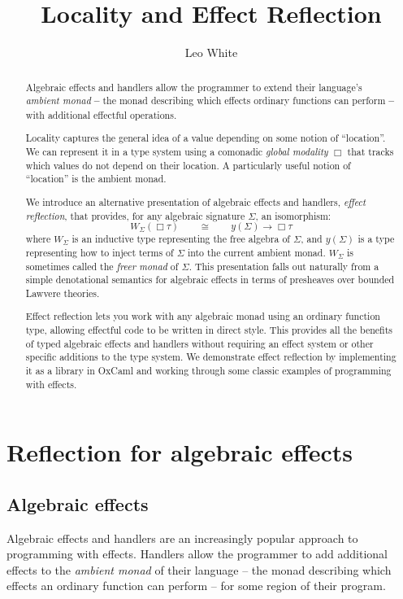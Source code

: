 \documentclass[acmsmall, screen, nonacm]{acmart}
\title{Locality and Effect Reflection}
\author{Leo White}
\affiliation{\institution{Jane Street}\country{UK}}
\date{}
\theoremstyle{definition}
\newcommand{\glob}{\mathop{\Box}}
\newcommand{\yoneda}[1]{y(#1)}
\newcommand{\ind}[1]{W_{#1}}
\begin{document}
\begin{abstract}
  Algebraic effects and handlers allow the programmer to extend their
  language's \emph{ambient monad} \textbf{--} the monad describing which
  effects ordinary functions can perform \textbf{--} with additional
  effectful operations.

  Locality captures the general idea of a value depending on some notion
  of ``location''. We can represent it in a type system using a
  comonadic \emph{global modality} $\glob$ that tracks which values do
  not depend on their location. A particularly useful notion of
  ``location'' is the ambient monad.

  We introduce an alternative presentation of algebraic effects and
  handlers, \emph{effect reflection}, that provides, for any algebraic
  signature $\Sigma$, an isomorphism:
  \begin{equation*}
    \ind{\Sigma}(\glob \tau) \qquad \cong \qquad \yoneda{\Sigma} \rightarrow \glob \tau
  \end{equation*}
  where $\ind{\Sigma}$ is an inductive type representing the free
  algebra of $\Sigma$, and $\yoneda{\Sigma}$ is a type representing how
  to inject terms of $\Sigma$ into the current ambient
  monad. $\ind{\Sigma}$ is sometimes called the \emph{freer monad} of
  $\Sigma$. This presentation falls out naturally from a simple
  denotational semantics for algebraic effects in terms of presheaves
  over bounded Lawvere theories.

  Effect reflection lets you work with any algebraic monad using an
  ordinary function type, allowing effectful code to be written in
  direct style. This provides all the benefits of typed algebraic
  effects and handlers without requiring an effect system or other
  specific additions to the type system. We demonstrate effect
  reflection by implementing it as a library in
  OxCaml\cite{lorenzen2024oxidizing} and working through some classic
  examples of programming with effects.
\end{abstract}

\maketitle

\section{Reflection for algebraic effects}

\subsection{Algebraic effects}
Algebraic effects and handlers are an increasingly popular approach to
programming with effects. Handlers allow the programmer to add
additional effects to the \emph{ambient monad} of their language -- the
monad describing which effects an ordinary function can perform -- for
some region of their program.
\end{document}
